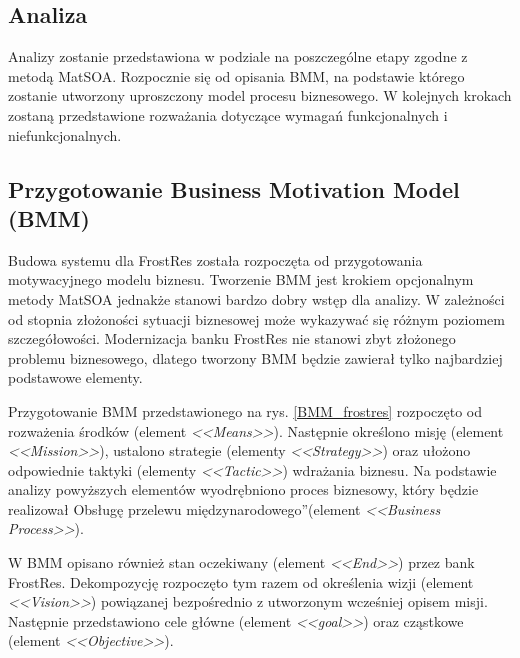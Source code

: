 \subsection{Analiza}
Analizy zostanie przedstawiona w podziale na poszczególne etapy zgodne z metodą MatSOA. Rozpocznie się od opisania BMM, na podstawie którego zostanie utworzony uproszczony model procesu biznesowego. W kolejnych krokach zostaną przedstawione rozważania dotyczące wymagań funkcjonalnych i niefunkcjonalnych.

\subsection*{Przygotowanie Business Motivation Model (BMM)}
Budowa systemu dla FrostRes została rozpoczęta od przygotowania motywacyjnego modelu biznesu. Tworzenie BMM jest krokiem opcjonalnym metody MatSOA jednakże stanowi bardzo dobry wstęp dla analizy. W zależności od stopnia złożoności sytuacji biznesowej może wykazywać się różnym poziomem szczegółowości. Modernizacja banku FrostRes nie stanowi zbyt złożonego problemu biznesowego, dlatego tworzony BMM będzie zawierał tylko najbardziej podstawowe elementy.

Przygotowanie BMM przedstawionego na rys. \ref{BMM_frostres} rozpoczęto od rozważenia środków (element \emph{<<Means>>}). Następnie określono misję (element \emph{<<Mission>>}), ustalono strategie (elementy \emph{<<Strategy>>}) oraz ułożono odpowiednie taktyki (elementy \emph{<<Tactic>>}) wdrażania biznesu. Na podstawie analizy powyższych elementów wyodrębniono proces biznesowy, który będzie realizował \quotedblbase Obsługę przelewu międzynarodowego\textquotedblright (element \emph{<<Business Process>>}). 

W BMM opisano również stan oczekiwany (element \emph{<<End>>}) przez bank FrostRes. Dekompozycję rozpoczęto tym razem od określenia wizji (element \emph{<<Vision>>}) powiązanej bezpośrednio z utworzonym wcześniej opisem misji. Następnie przedstawiono cele główne (element \emph{<<goal>>}) oraz cząstkowe (element \emph{<<Objective>>}).

